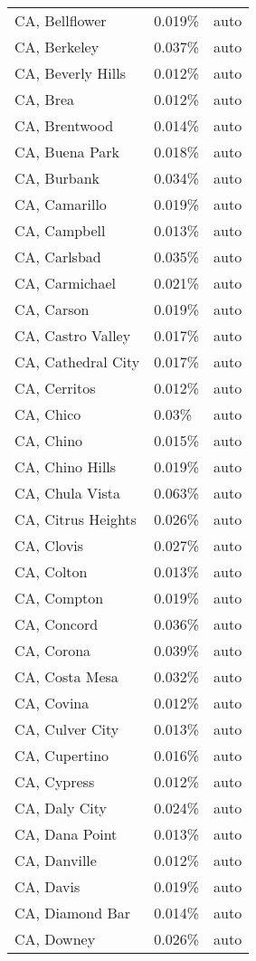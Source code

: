 \begin{longtable}[]{@{}lll@{}}
CA, Bellflower & 0.019\% & auto \\
CA, Berkeley & 0.037\% & auto \\
CA, Beverly Hills & 0.012\% & auto \\
CA, Brea & 0.012\% & auto \\
CA, Brentwood & 0.014\% & auto \\
CA, Buena Park & 0.018\% & auto \\
CA, Burbank & 0.034\% & auto \\
CA, Camarillo & 0.019\% & auto \\
CA, Campbell & 0.013\% & auto \\
CA, Carlsbad & 0.035\% & auto \\
CA, Carmichael & 0.021\% & auto \\
CA, Carson & 0.019\% & auto \\
CA, Castro Valley & 0.017\% & auto \\
CA, Cathedral City & 0.017\% & auto \\
CA, Cerritos & 0.012\% & auto \\
CA, Chico & 0.03\% & auto \\
CA, Chino & 0.015\% & auto \\
CA, Chino Hills & 0.019\% & auto \\
CA, Chula Vista & 0.063\% & auto \\
CA, Citrus Heights & 0.026\% & auto \\
CA, Clovis & 0.027\% & auto \\
CA, Colton & 0.013\% & auto \\
CA, Compton & 0.019\% & auto \\
CA, Concord & 0.036\% & auto \\
CA, Corona & 0.039\% & auto \\
CA, Costa Mesa & 0.032\% & auto \\
CA, Covina & 0.012\% & auto \\
CA, Culver City & 0.013\% & auto \\
CA, Cupertino & 0.016\% & auto \\
CA, Cypress & 0.012\% & auto \\
CA, Daly City & 0.024\% & auto \\
CA, Dana Point & 0.013\% & auto \\
CA, Danville & 0.012\% & auto \\
CA, Davis & 0.019\% & auto \\
CA, Diamond Bar & 0.014\% & auto \\
CA, Downey & 0.026\% & auto \\

\end{longtable}
